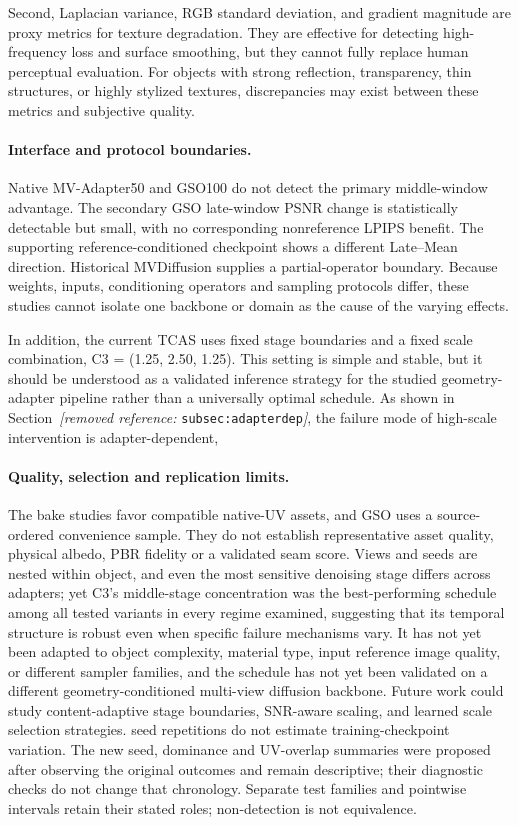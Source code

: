 \documentclass[times,twocolumn,final]{elsarticle}
\providecommand{\DIFadd}[1]{{\protect\color{blue} \sf #1}} %
\providecommand{\DIFdel}[1]{{\protect\color{red} \scriptsize #1}} %
\providecommand{\DIFaddbegin}{} %
\providecommand{\DIFaddend}{} %
\providecommand{\DIFdelbegin}{} %
\providecommand{\DIFdelend}{} %
\begin{document}
\DIFdel{Second, Laplacian variance, RGB standard deviation, and gradient magnitude are proxy metrics for texture degradation. They are effective for detecting high-frequency loss and surface smoothing, but they cannot fully replace human perceptual evaluation. For objects with strong reflection, transparency, thin structures, or highly stylized textures, discrepancies may exist between these metrics and subjective quality.
}\DIFdelend \DIFaddbegin \paragraph{Interface and protocol boundaries.}
\DIFadd{Native MV-Adapter50 and GSO100 do not detect the primary middle-window advantage. The secondary GSO late-window PSNR change is statistically detectable but small, with no corresponding nonreference LPIPS benefit. The supporting reference-conditioned checkpoint shows a different Late--Mean direction. Historical MVDiffusion supplies a partial-operator boundary. Because weights, inputs, conditioning operators and sampling protocols differ, these studies cannot isolate one backbone or domain as the cause of the varying effects.
}\DIFaddend 

\DIFdelbegin \DIFdel{In addition, the current TCAS uses fixed stage boundaries and a fixed scale combination, C3 = (1.25, 2.50, 1.25).
This setting is simple and stable, but it should be understood as a validated inference strategy for the studied geometry-adapter pipeline rather than a universally optimal schedule. As shown in Section~\textit{[removed reference: }\texttt{subsec:adapterdep}\textit{]}, the failure mode of high-scale intervention is adapter-dependent, }\DIFdelend \DIFaddbegin \paragraph{Quality, selection and replication limits.}
\DIFadd{The bake studies favor compatible native-UV assets, and GSO uses a source-ordered convenience sample. They do not establish representative asset quality, physical albedo, PBR fidelity or a validated seam score. Views and seeds are nested within object, }\DIFaddend and \DIFdelbegin \DIFdel{even the most sensitive denoising stage differs across adapters; yet C3's middle-stage concentration was the best-performing schedule among all tested variants in every regime examined, suggesting that its temporal structure is robust even when specific failure mechanisms vary. It has not yet been adapted to object complexity, material type, input reference image quality, or different sampler families, and the schedule has not yet been validated on a different geometry-conditioned multi-view diffusion backbone. Future work could study content-adaptive stage boundaries, SNR-aware scaling, and learned scale selection strategies.
}\DIFdelend \DIFaddbegin \DIFadd{seed repetitions do not estimate training-checkpoint variation. The new seed, dominance and UV-overlap summaries were proposed after observing the original outcomes and remain descriptive; their diagnostic checks do not change that chronology. Separate test families and pointwise intervals retain their stated roles; non-detection is not equivalence.
}\DIFaddend 
\end{document}
